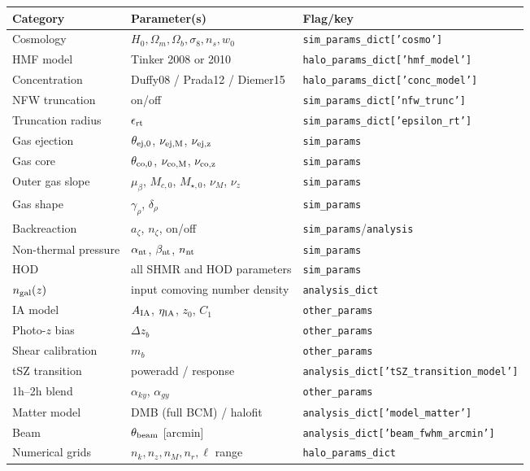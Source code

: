 \documentclass[12pt,a4paper]{article}
\newcommand{\param}[1]{\texttt{\small #1}}
\begin{document}
\begin{center}
\begin{tabular}{lll}
\toprule
Category & Parameter(s) & Flag/key \\
\midrule
Cosmology & $H_0,\Omega_m,\Omega_b,\sigma_8,n_s,w_0$ & \param{sim\_params\_dict['cosmo']} \\
HMF model & Tinker 2008 or 2010 & \param{halo\_params\_dict['hmf\_model']} \\
Concentration & Duffy08 / Prada12 / Diemer15 & \param{halo\_params\_dict['conc\_model']} \\
NFW truncation & on/off & \param{sim\_params\_dict['nfw\_trunc']} \\
Truncation radius & $\epsilon_{\rm rt}$ & \param{sim\_params\_dict['epsilon\_rt']} \\
Gas ejection & $\theta_{\rm ej,0}$, $\nu_{\rm ej,M}$, $\nu_{\rm ej,z}$ & \param{sim\_params} \\
Gas core & $\theta_{\rm co,0}$, $\nu_{\rm co,M}$, $\nu_{\rm co,z}$ & \param{sim\_params} \\
Outer gas slope & $\mu_\beta$, $M_{c,0}$, $M_{\star,0}$, $\nu_M$, $\nu_z$ & \param{sim\_params} \\
Gas shape & $\gamma_\rho$, $\delta_\rho$ & \param{sim\_params} \\
Backreaction & $a_\zeta$, $n_\zeta$, on/off & \param{sim\_params}/\param{analysis} \\
Non-thermal pressure & $\alpha_{\rm nt}$, $\beta_{\rm nt}$, $n_{\rm nt}$ & \param{sim\_params} \\
HOD & all SHMR and HOD parameters & \param{sim\_params} \\
$n_{\rm gal}(z)$ & input comoving number density & \param{analysis\_dict} \\
IA model & $A_{\rm IA}$, $\eta_{\rm IA}$, $z_0$, $C_1$ & \param{other\_params} \\
Photo-$z$ bias & $\Delta z_b$ & \param{other\_params} \\
Shear calibration & $m_b$ & \param{other\_params} \\
tSZ transition & poweradd / response & \param{analysis\_dict['tSZ\_transition\_model']} \\
1h--2h blend & $\alpha_{ky}$, $\alpha_{gy}$ & \param{other\_params} \\
Matter model & DMB (full BCM) / halofit & \param{analysis\_dict['model\_matter']} \\
Beam & $\theta_{\rm beam}$ [arcmin] & \param{analysis\_dict['beam\_fwhm\_arcmin']} \\
Numerical grids & $n_k,n_z,n_M,n_r,\ell$ range & \param{halo\_params\_dict} \\
\bottomrule
\end{tabular}
\end{center}
\end{document}

